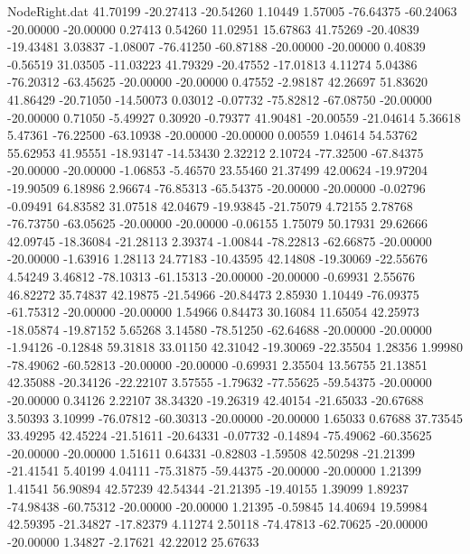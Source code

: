 \begin{filecontents}{NodeRight.dat}
  41.70199  -20.27413  -20.54260     1.10449    1.57005  -76.64375  -60.24063  -20.00000  -20.00000    0.27413    0.54260   11.02951   15.67863
  41.75269  -20.40839  -19.43481     3.03837   -1.08007  -76.41250  -60.87188  -20.00000  -20.00000    0.40839   -0.56519   31.03505  -11.03223
  41.79329  -20.47552  -17.01813     4.11274    5.04386  -76.20312  -63.45625  -20.00000  -20.00000    0.47552   -2.98187   42.26697   51.83620
  41.86429  -20.71050  -14.50073     0.03012   -0.07732  -75.82812  -67.08750  -20.00000  -20.00000    0.71050   -5.49927    0.30920   -0.79377
  41.90481  -20.00559  -21.04614     5.36618    5.47361  -76.22500  -63.10938  -20.00000  -20.00000    0.00559    1.04614   54.53762   55.62953
  41.95551  -18.93147  -14.53430     2.32212    2.10724  -77.32500  -67.84375  -20.00000  -20.00000   -1.06853   -5.46570   23.55460   21.37499
  42.00624  -19.97204  -19.90509     6.18986    2.96674  -76.85313  -65.54375  -20.00000  -20.00000   -0.02796   -0.09491   64.83582   31.07518
  42.04679  -19.93845  -21.75079     4.72155    2.78768  -76.73750  -63.05625  -20.00000  -20.00000   -0.06155    1.75079   50.17931   29.62666
  42.09745  -18.36084  -21.28113     2.39374   -1.00844  -78.22813  -62.66875  -20.00000  -20.00000   -1.63916    1.28113   24.77183  -10.43595
  42.14808  -19.30069  -22.55676     4.54249    3.46812  -78.10313  -61.15313  -20.00000  -20.00000   -0.69931    2.55676   46.82272   35.74837
  42.19875  -21.54966  -20.84473     2.85930    1.10449  -76.09375  -61.75312  -20.00000  -20.00000    1.54966    0.84473   30.16084   11.65054
  42.25973  -18.05874  -19.87152     5.65268    3.14580  -78.51250  -62.64688  -20.00000  -20.00000   -1.94126   -0.12848   59.31818   33.01150
  42.31042  -19.30069  -22.35504     1.28356    1.99980  -78.49062  -60.52813  -20.00000  -20.00000   -0.69931    2.35504   13.56755   21.13851
  42.35088  -20.34126  -22.22107     3.57555   -1.79632  -77.55625  -59.54375  -20.00000  -20.00000    0.34126    2.22107   38.34320  -19.26319
  42.40154  -21.65033  -20.67688     3.50393    3.10999  -76.07812  -60.30313  -20.00000  -20.00000    1.65033    0.67688   37.73545   33.49295
  42.45224  -21.51611  -20.64331    -0.07732   -0.14894  -75.49062  -60.35625  -20.00000  -20.00000    1.51611    0.64331   -0.82803   -1.59508
  42.50298  -21.21399  -21.41541     5.40199    4.04111  -75.31875  -59.44375  -20.00000  -20.00000    1.21399    1.41541   56.90894   42.57239
  42.54344  -21.21395  -19.40155     1.39099    1.89237  -74.98438  -60.75312  -20.00000  -20.00000    1.21395   -0.59845   14.40694   19.59984
  42.59395  -21.34827  -17.82379     4.11274    2.50118  -74.47813  -62.70625  -20.00000  -20.00000    1.34827   -2.17621   42.22012   25.67633

\end{filecontents}
